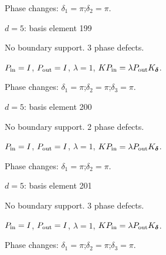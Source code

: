 \par\smallskip\begin{minipage}{.98\linewidth}\small Phase changes: $\delta_{1}=\pi$;\quad $\delta_{2}=\pi$.\end{minipage}
\vfill
{\footnotesize\texttt{}}
\newpage
{}
{\Large $d=5$: basis element 199}\par
No boundary support. 3 phase defects.
\begin{center}
\end{center}
\vspace{-1mm}
$P_{\rm in}=I$, \quad $P_{\rm out}=I$, \quad $\lambda=1$, \qquad $K P_{\rm in}=\lambda P_{\rm out}K_{\boldsymbol\delta}$.
\par\smallskip\begin{minipage}{.98\linewidth}\small Phase changes: $\delta_{1}=\pi$;\quad $\delta_{2}=\pi$;\quad $\delta_{3}=\pi$.\end{minipage}
\vfill
{\footnotesize\texttt{}}
\newpage
{}
{\Large $d=5$: basis element 200}\par
No boundary support. 2 phase defects.
\begin{center}
\end{center}
\vspace{-1mm}
$P_{\rm in}=I$, \quad $P_{\rm out}=I$, \quad $\lambda=1$, \qquad $K P_{\rm in}=\lambda P_{\rm out}K_{\boldsymbol\delta}$.
\par\smallskip\begin{minipage}{.98\linewidth}\small Phase changes: $\delta_{1}=\pi$;\quad $\delta_{2}=\pi$.\end{minipage}
\vfill
{\footnotesize\texttt{}}
\newpage
{}
{\Large $d=5$: basis element 201}\par
No boundary support. 3 phase defects.
\begin{center}
\end{center}
\vspace{-1mm}
$P_{\rm in}=I$, \quad $P_{\rm out}=I$, \quad $\lambda=1$, \qquad $K P_{\rm in}=\lambda P_{\rm out}K_{\boldsymbol\delta}$.
\par\smallskip\begin{minipage}{.98\linewidth}\small Phase changes: $\delta_{1}=\pi$;\quad $\delta_{2}=\pi$;\quad $\delta_{3}=\pi$.\end{minipage}
